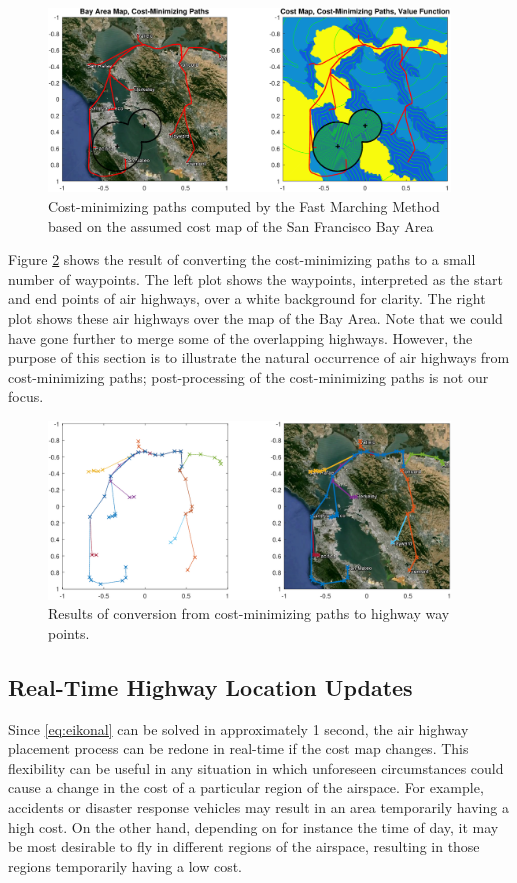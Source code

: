 \begin{figure}
	\centering
	\includegraphics[width=0.95\textwidth]{"fig/airHighway_results"}
	\caption{Cost-minimizing paths computed by the Fast Marching Method based on the assumed cost map of the San Francisco Bay Area}
	\label{fig:airHighway_results}
\end{figure}

Figure \ref{fig:airHighway_sparse} shows the result of converting the cost-minimizing paths to a small number of waypoints. The left plot shows the waypoints, interpreted as the start and end points of air highways, over a white background for clarity. The right plot shows these air highways over the map of the Bay Area. Note that we could have gone further to merge some of the overlapping highways. However, the purpose of this section is to illustrate the natural occurrence of air highways from cost-minimizing paths; post-processing of the cost-minimizing paths is not our focus.

\begin{figure}
	\centering
	\includegraphics[width=0.95\textwidth]{"fig/airHighway_sparse"}
	\caption{Results of conversion from cost-minimizing paths to highway way points.}
	\label{fig:airHighway_sparse}
\end{figure}

\subsection{Real-Time Highway Location Updates}
Since \eqref{eq:eikonal} can be solved in approximately 1 second, the air highway placement process can be redone in real-time if the cost map changes. This flexibility can be useful in any situation in which unforeseen circumstances could cause a change in the cost of a particular region of the airspace. For example, accidents or disaster response vehicles may result in an area temporarily having a high cost. On the other hand, depending on for instance the time of day, it may be most desirable to fly in different regions of the airspace, resulting in those regions temporarily having a low cost.